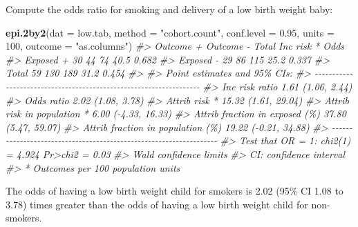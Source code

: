 \documentclass[
]{article}
\newenvironment{Shaded}{\begin{snugshade}}{\end{snugshade}}
\newcommand{\CommentTok}[1]{\textcolor[rgb]{0.56,0.35,0.01}{\textit{#1}}}
\newcommand{\DataTypeTok}[1]{\textcolor[rgb]{0.13,0.29,0.53}{#1}}
\newcommand{\DecValTok}[1]{\textcolor[rgb]{0.00,0.00,0.81}{#1}}
\newcommand{\FloatTok}[1]{\textcolor[rgb]{0.00,0.00,0.81}{#1}}
\newcommand{\KeywordTok}[1]{\textcolor[rgb]{0.13,0.29,0.53}{\textbf{#1}}}
\newcommand{\NormalTok}[1]{#1}
\newcommand{\StringTok}[1]{\textcolor[rgb]{0.31,0.60,0.02}{#1}}
\begin{document}
Compute the odds ratio for smoking and delivery of a low birth weight
baby:

\begin{Shaded}
\begin{Highlighting}[]
\KeywordTok{epi.2by2}\NormalTok{(}\DataTypeTok{dat =}\NormalTok{ low.tab, }\DataTypeTok{method =} \StringTok{"cohort.count"}\NormalTok{, }\DataTypeTok{conf.level =} \FloatTok{0.95}\NormalTok{, }
   \DataTypeTok{units =} \DecValTok{100}\NormalTok{, }\DataTypeTok{outcome =} \StringTok{"as.columns"}\NormalTok{)}
\CommentTok{\#\textgreater{}              Outcome +    Outcome {-}      Total        Inc risk *        Odds}
\CommentTok{\#\textgreater{} Exposed +           30           44         74              40.5       0.682}
\CommentTok{\#\textgreater{} Exposed {-}           29           86        115              25.2       0.337}
\CommentTok{\#\textgreater{} Total               59          130        189              31.2       0.454}
\CommentTok{\#\textgreater{} }
\CommentTok{\#\textgreater{} Point estimates and 95\% CIs:}
\CommentTok{\#\textgreater{} {-}{-}{-}{-}{-}{-}{-}{-}{-}{-}{-}{-}{-}{-}{-}{-}{-}{-}{-}{-}{-}{-}{-}{-}{-}{-}{-}{-}{-}{-}{-}{-}{-}{-}{-}{-}{-}{-}{-}{-}{-}{-}{-}{-}{-}{-}{-}{-}{-}{-}{-}{-}{-}{-}{-}{-}{-}{-}{-}{-}{-}{-}{-}{-}{-}{-}{-}}
\CommentTok{\#\textgreater{} Inc risk ratio                               1.61 (1.06, 2.44)}
\CommentTok{\#\textgreater{} Odds ratio                                   2.02 (1.08, 3.78)}
\CommentTok{\#\textgreater{} Attrib risk *                                15.32 (1.61, 29.04)}
\CommentTok{\#\textgreater{} Attrib risk in population *                  6.00 ({-}4.33, 16.33)}
\CommentTok{\#\textgreater{} Attrib fraction in exposed (\%)               37.80 (5.47, 59.07)}
\CommentTok{\#\textgreater{} Attrib fraction in population (\%)            19.22 ({-}0.21, 34.88)}
\CommentTok{\#\textgreater{} {-}{-}{-}{-}{-}{-}{-}{-}{-}{-}{-}{-}{-}{-}{-}{-}{-}{-}{-}{-}{-}{-}{-}{-}{-}{-}{-}{-}{-}{-}{-}{-}{-}{-}{-}{-}{-}{-}{-}{-}{-}{-}{-}{-}{-}{-}{-}{-}{-}{-}{-}{-}{-}{-}{-}{-}{-}{-}{-}{-}{-}{-}{-}{-}{-}{-}{-}}
\CommentTok{\#\textgreater{}  Test that OR = 1: chi2(1) = 4.924 Pr\textgreater{}chi2 = 0.03}
\CommentTok{\#\textgreater{}  Wald confidence limits}
\CommentTok{\#\textgreater{}  CI: confidence interval}
\CommentTok{\#\textgreater{}  * Outcomes per 100 population units}
\end{Highlighting}
\end{Shaded}

The odds of having a low birth weight child for smokers is 2.02 (95\% CI
1.08 to 3.78) times greater than the odds of having a low birth weight
child for non-smokers.
\end{document}
